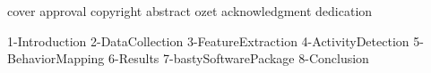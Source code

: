 \documentclass[12pt, leqno, oneside, a4paper]{book}
\begin{document}
\sloppy
{}
{cover}
{approval}
{copyright}
\clearpage \pagebreak
{} \setcounter{page}{3}
{abstract}
{ozet}
{acknowledgment}
{dedication}
\clearpage \pagebreak
\tableofcontents
\clearpage\pagebreak
{}
{\let\onumline\numberline\renewcommand{\numberline}{\tablename~\onumline}\listoftables}
\clearpage\pagebreak
{}
{\let\onumline\numberline\renewcommand{\numberline}{\figurename~\onumline}\listoffigures}

\pagestyle{fancy}
\renewcommand{\headrulewidth}{0.0pt}
\renewcommand{\footrulewidth}{0.0pt}
\rhead[]{}
\chead[]{}
\lhead[]{}
\lfoot[]{}
\cfoot[]{\thepage}
\rfoot[]{}

\clearpage \pagebreak
 \setcounter{page}{1}
\onehalfspacing
{1-Introduction}
{2-DataCollection}
{3-FeatureExtraction}
{4-ActivityDetection}
{5-BehaviorMapping}
{6-Results}
{7-bastySoftwarePackage}
{8-Conclusion}

\renewcommand{\headrulewidth}{0.0pt}
\renewcommand{\footrulewidth}{0.0pt}
\rhead[]{}
\chead[]{}
\lhead[]{}
\lfoot[]{}
\cfoot[]{\thepage}
\rfoot[]{}

\clearpage \pagebreak \singlespace \normalsize
{}

\end{document}
